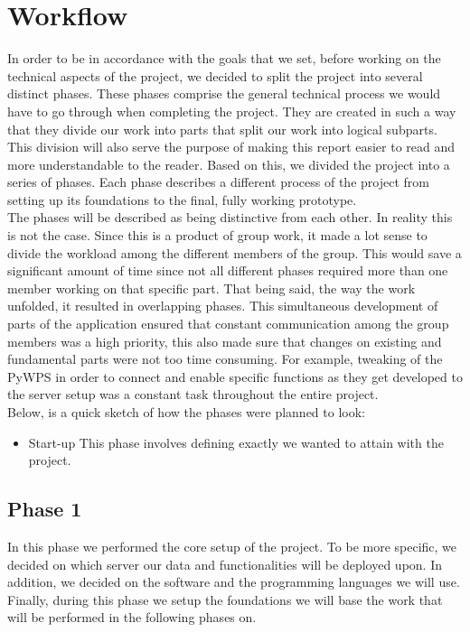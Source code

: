 \section{Workflow}
In order to be in accordance with the goals that we set, before working on the technical aspects of the project, we decided to split the project into several distinct phases. These phases comprise the general technical process we would have to go through when completing the project. They are created in such a way that they divide our work into parts that split our work into logical subparts. This division will also serve the purpose of making this report easier to read and more understandable to the reader.   
Based on this, we divided the project into a series of phases. Each phase describes a different process of the project from setting up its foundations to the final, fully working prototype. \\
The phases will be described as being distinctive from each other. In reality this is not the case. Since this is a product of group work, it made a lot sense to divide the workload among the different members of the group. This would save a significant amount of time since not all different phases required more than one member working on that specific part. That being said, the way the work unfolded, it resulted in overlapping phases. This simultaneous development of parts of the application ensured that constant communication among the group members was a high priority, this also made sure that changes on existing and fundamental parts were not too time consuming. For example, tweaking of the PyWPS  in order to connect and enable specific functions as they get developed to the server setup was a constant task throughout the entire project.\\

Below, is a quick sketch of how the phases were planned to look:

\begin{itemize}

\item Start-up
This phase involves defining exactly we wanted to attain with the project.

\end{itemize}

\subsection{Phase 1}
In this phase we performed the core setup of the project. To be more specific, we decided on which server our data and functionalities will be deployed upon. In addition, we decided on the software and the programming languages  we will use. Finally, during this phase we setup the foundations we will base the work that will be performed in the following phases on.

